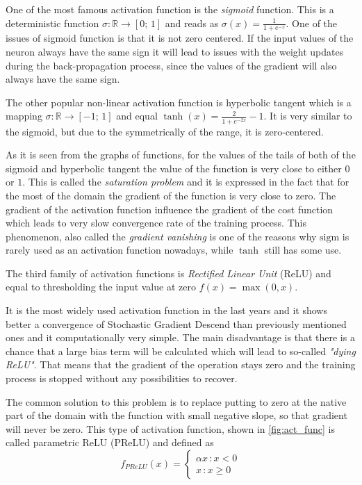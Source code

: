 One of the most famous activation function is the \emph{sigmoid} function.
This is a deterministic function $ \sigma : \mathbb{R} \rightarrow [0; \, 1] $ and reads as $ \sigma(x) = \frac{1}{1+e^{-x}} $.
One of the issues of sigmoid function is that it is not zero centered.
If the input values of the neuron always have the same sign it will lead to issues with the weight updates during the back-propagation process, since the values of the gradient will also always have the same sign.
\medskip

The other popular non-linear activation function is hyperbolic tangent which is a mapping $ \sigma : \mathbb{R} \rightarrow [-1; \, 1]$ and equal $\tanh(x)=\frac{2}{1+e^{-2x}}-1$.
It is very similar to the sigmoid, but due to the symmetrically of the range, it is zero-centered.
\medskip

As it is seen from the graphs of functions, for the values of the tails of both of the sigmoid and hyperbolic tangent the value of the function is very close to either $0$ or $1$.
This is called the \emph{saturation problem} and it is expressed in the fact that for the most of the domain the gradient of the function is very close to zero.
The gradient of the activation function influence the gradient of the cost function which leads to very slow convergence rate of the training process.
This phenomenon, also called the \emph{gradient vanishing} is one of the reasons why $\mathrm{sigm}$ is rarely used as an activation function nowadays, while $\tanh$ still has some use.
\medskip

The third family of activation functions is \emph{Rectified Linear Unit} (ReLU) and equal to thresholding the input value at zero $f(x)=\max(0,x)$. 
\medskip

It is the most widely used activation function in the last years and it shows better a convergence of Stochastic Gradient Descend than previously mentioned ones and it computationally very simple.
The main disadvantage is that there is a chance that a large bias term will be calculated which will lead to so-called \emph{"dying ReLU"}. 
That means that the gradient of the operation stays zero and the training process is stopped without any possibilities to recover. 
\medskip

The common solution to this problem is to replace putting to zero at the native part of the domain with the function with small negative slope, so that gradient will never be zero. 
This type of activation function, shown in \ref{fig:act_func} is called parametric ReLU (PReLU) and defined as  
\[ f_{PReLU}(x) = 
\begin{cases}
\alpha x \, :x<0 \\
x \, : x \geq 0
\end{cases}
\]

